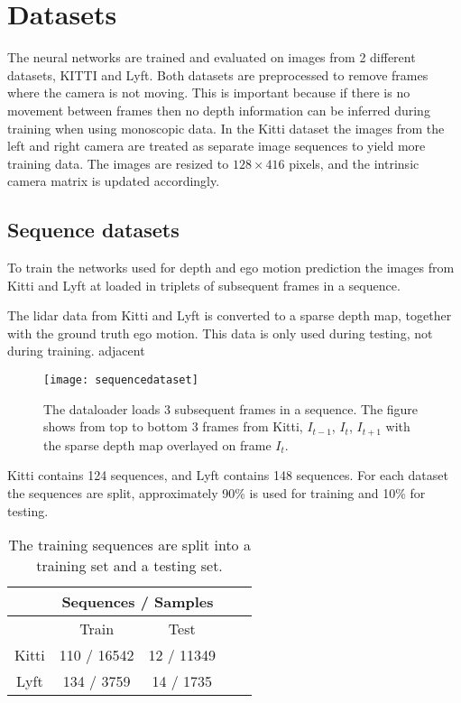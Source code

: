 \section{Datasets}

The neural networks are trained and evaluated on images from 2 different datasets, KITTI\cite{kitti} and Lyft\cite{lyft2019}. Both datasets are preprocessed to remove frames where the camera is not moving. This is important because if there is no movement between frames then no depth information can be inferred during training when using monoscopic data. In the Kitti dataset the images from the left and right camera are treated as separate image sequences to yield more training data. The images are resized to $128\times 416$ pixels, and the intrinsic camera matrix is updated accordingly.

\subsection{Sequence datasets}

To train the networks used for depth and ego motion prediction the images from Kitti and Lyft at loaded in triplets of subsequent frames in a sequence.

The lidar data from Kitti and Lyft is converted to a sparse depth map, together with the ground truth ego motion. This data is only used during testing, not during training.
adjacent
\begin{figure}[H]
	\centering
	\texttt{[image: sequencedataset]}
	\caption{The dataloader loads 3 subsequent frames in a sequence. The figure shows from top to bottom 3 frames from Kitti, $I_{t-1}$, $I_t$, $I_{t+1}$ with the sparse depth map overlayed on frame $I_t$.}
	\label{fig:sequencedataset}
\end{figure}

Kitti contains 124 sequences, and Lyft contains 148 sequences. For each dataset the sequences are split, approximately 90\% is used for training and 10\% for testing.

\begin{table}[H]
	\centering
	\begin{tabular}{ |c|c|c|c|c| } 
		\hline
		&\multicolumn{2}{c|}{Sequences / Samples} \\ 
		\hline
		& Train & Test \\ 
		\hline
		Kitti & 110 / 16542 & 12 / 11349 \\ 
		\hline
		Lyft & 134 / 3759 & 14 / 1735 \\ 
		\hline
	\end{tabular}
	\caption{The training sequences are split into a training set and a testing set.}
	\label{table:datasets}
\end{table}

